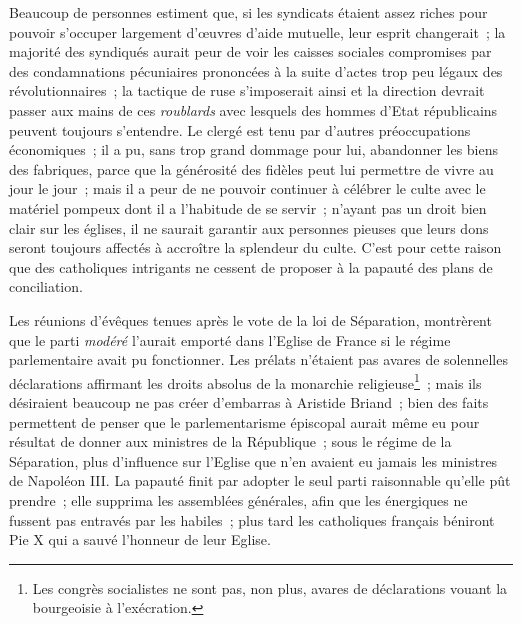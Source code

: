 \documentclass[french,twoside]{book} %
\begin{document}
Beaucoup de personnes estiment que, si les syndicats étaient assez riches pour pouvoir s’occuper largement d’œuvres d’aide mutuelle, leur esprit changerait ; la majorité des syndiqués aurait peur de voir les caisses sociales compromises par des condamnations pécuniaires prononcées à la suite d’actes trop peu légaux des révolutionnaires ; la tactique de ruse s’imposerait ainsi et la direction devrait passer aux mains de ces \emph{roublards} avec lesquels des hommes d’Etat républicains peuvent toujours s’entendre. Le clergé est tenu par  d’autres préoccupations économiques ; il a pu, sans trop grand dommage pour lui, abandonner les biens des fabriques, parce que la générosité des fidèles peut lui permettre de vivre au jour le jour ; mais il a peur de ne pouvoir continuer à célébrer le culte avec le matériel pompeux dont il a l’habitude de se servir ; n’ayant pas un droit bien clair sur les églises, il ne saurait garantir aux personnes pieuses que leurs dons seront toujours affectés à accroître la splendeur du culte. C’est pour cette raison que des catholiques intrigants ne cessent de proposer à la papauté des plans de conciliation.\par
Les réunions d’évêques tenues après le vote de la loi de Séparation, montrèrent que le parti \emph{modéré} l’aurait emporté dans l’Eglise de France si le régime parlementaire avait pu fonctionner. Les prélats n’étaient pas avares de solennelles déclarations affirmant les droits absolus de la monarchie religieuse\footnote{ \noindent Les congrès socialistes ne sont pas, non plus, avares de déclarations vouant la bourgeoisie à l’exécration.
 } ; mais ils désiraient beaucoup ne pas créer d’embarras à Aristide Briand ; bien des faits permettent de penser que le parlementarisme épiscopal aurait même eu pour résultat de donner aux ministres de la République ; sous le régime de la Séparation, plus d’influence sur l’Eglise que n’en avaient eu jamais les ministres de Napoléon III. La papauté finit par adopter le seul parti raisonnable qu’elle pût prendre ; elle supprima les assemblées générales, afin que les énergiques ne fussent pas entravés par les habiles ; plus tard les catholiques français béniront Pie X qui a sauvé l’honneur de leur Eglise.\par
\end{document}
